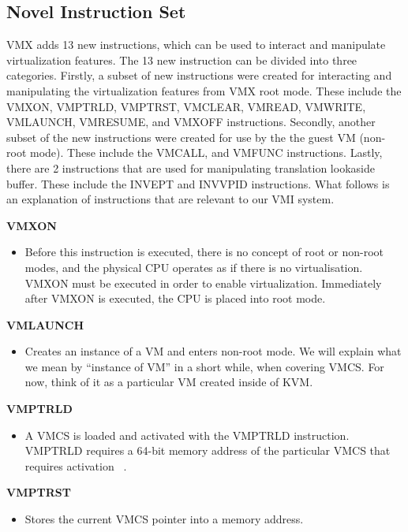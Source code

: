 \documentclass{report}
\begin{document}
\begin{spacing}{1.5}
\subsection{Novel Instruction Set}

{\large
VMX adds 13 new instructions, which can be used to interact and manipulate virtualization features. The 13 new instruction can be divided into three categories. Firstly, a subset of new instructions were created for interacting and manipulating the virtualization features from VMX root mode. These include the VMXON, VMPTRLD, VMPTRST, VMCLEAR, VMREAD, VMWRITE, VMLAUNCH, VMRESUME, and VMXOFF instructions. Secondly, another subset of the new instructions were created for use by the the guest VM (non-root mode). These include the VMCALL, and VMFUNC instructions. Lastly, there are 2 instructions that are used for manipulating translation lookaside buffer. These include the INVEPT and INVVPID instructions. What follows is an explanation of instructions that are relevant to our VMI system.
\newline
}

{\large

\textbf{VMXON}
\begin{itemize}
\item[] Before this instruction is executed, there is no concept of root or non-root modes, and the physical CPU operates as if there is no virtualisation. VMXON must be executed in order to enable virtualization. Immediately after VMXON is executed, the CPU is placed into root mode.
\end{itemize}

\textbf{VMLAUNCH}
\begin{itemize}
\item[] Creates an instance of a VM and enters non-root mode. We will explain what we mean by “instance of VM” in a short while, when covering VMCS. For now, think of it as a particular VM created inside of KVM.
\end{itemize}

\textbf{VMPTRLD}
\begin{itemize}
\item[] A VMCS is loaded and activated with the VMPTRLD instruction. VMPTRLD requires a 64-bit memory address of the particular VMCS that requires activation ~\cite{osdevwikivmx}.
\end{itemize}

\textbf{VMPTRST}
\begin{itemize}
\item[] {\large Stores the current VMCS pointer into a memory address.}
\end{itemize}

}
\end{spacing}
\end{document}
